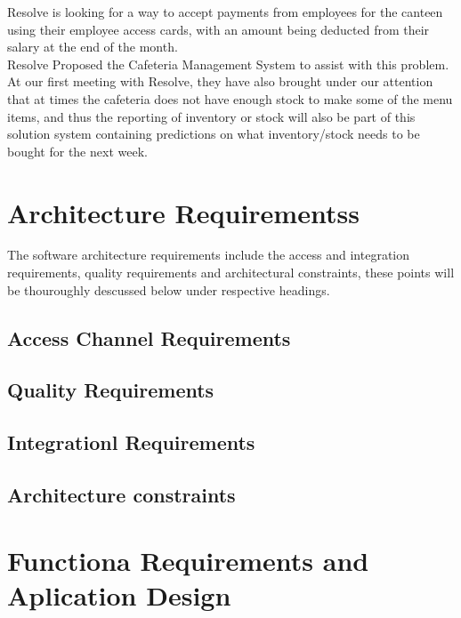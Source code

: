 \documentclass[12pt]{article}
\begin{document}
Resolve is looking for a way to accept payments from employees for the canteen
using their employee access cards, with an amount being deducted from their salary at the end of the month.\\

Resolve Proposed the Cafeteria Management System to assist with this problem.
At our first meeting with Resolve, they have also brought under our attention that at times the cafeteria does not have enough stock to make some of the menu items, and thus the reporting of inventory or stock will also be part of this solution system containing predictions on what inventory/stock needs to be bought for the next week.

\section{Architecture Requirementss}
The software architecture requirements include the access and integration requirements, quality
requirements and architectural constraints, these points will be thouroughly descussed below under respective headings.

\subsection{Access Channel Requirements}



\subsection{Quality Requirements}

\subsection{Integrationl Requirements}

\subsection{Architecture constraints}

\section{Functiona Requirements and Aplication Design}
\end{document}
